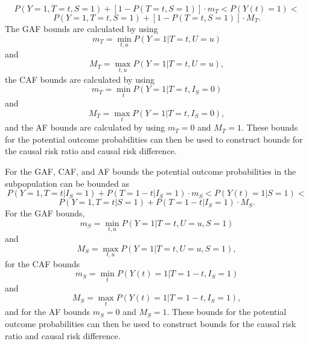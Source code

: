 \[
P(Y=1,T=t,S=1)+\left[1-P(T=t,S=1)\right]\cdot m_T < P(Y(t)=1) <
\]
\[
P(Y=1,T=t,S=1)+\left[1-P(T=t,S=1)\right]\cdot M_T.
\]
The GAF bounds are calculated by using
\[
    m_T=\min_{t,u}P(Y=1|T=t,U=u)
\]
and
\[
    M_T= \max_{t,u}P(Y=1|T=t,U=u),
\]
the CAF bounds are calculated by using
\[
    m_T=\min_t P(Y=1|T=t,I_S=0)
\]
and
\[
    M_T=\max_t P(Y=1|T=t,I_S=0),
\]
and the AF bounds are calculated by using \(m_T=0\) and \(M_T=1\). These bounds
for the potential outcome probabilities can then be used to construct bounds
for the causal risk ratio and causal risk difference.

For the GAF, CAF, and AF bounds the potential outcome probabilities in the
subpopulation can be bounded as
\[
    P(Y=1,T=t|I_S=1) + P(T=1-t|I_S=1)\cdot m_S < P(Y(t)=1|S=1) < 
\]
\[
    P(Y=1,T=t|S=1) + P(T=1-t|I_S=1)\cdot M_S.
\]
For the GAF bounds,
\[
    m_S=\min_{t,u}P(Y=1|T=t,U=u,S=1)
\]
and
\[
    M_S =\max_{t,u}P(Y=1|T=t,U=u,S=1),
\]
for the CAF bounds
\[
    m_S=\min_t P(Y(t)=1|T=1-t,I_S=1)
\]
and
\[
    M_S=\max_t P(Y(t)=1|T=1-t,I_S=1),
\]
and for the AF bounds \(m_S=0\) and \(M_S=1\). These bounds for the potential
outcome probabilities can then be used to construct bounds for the causal risk
ratio and causal risk difference.



\address{%
Stina Zetterstrom\\
Uppsala University\\%
Department of Statistics\\ Uppsala, Sweden\\
%
\url{https://www.statistik.uu.se/?languageId=1}\\%
\textit{ORCiD: \href{https://orcid.org/0000-0003-0730-9425}{0000-0003-0730-9425}}\\%
\href{mailto:stina.zetterstrom@gmail.com}{\nolinkurl{stina.zetterstrom@gmail.com}}%
}

\address{%
Ingeborg Waernbaum\\
Uppsala University\\%
Department of Statistics\\ Uppsala, Sweden\\
%
\url{https://www.statistik.uu.se/?languageId=1}\\%
\textit{ORCiD: \href{https://orcid.org/0000-0002-4457-5311}{0000-0002-4457-5311}}\\%
\href{mailto:ingeborg.waernbaum@statistics.uu.se}{\nolinkurl{ingeborg.waernbaum@statistics.uu.se}}%
}
